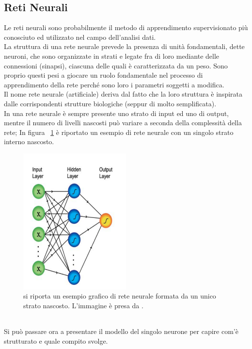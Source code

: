 \newpage

\subsection{Reti Neurali}
\label{reti neurali}
Le reti neurali sono probabilmente il metodo di apprendimento supervisionato più conosciuto ed utilizzato nel campo dell'analisi dati. \\
La struttura di una rete neurale prevede la presenza di unità fondamentali, dette neuroni, che sono organizzate in strati e legate fra di loro mediante delle connessioni (sinapsi), ciascuna delle quali è caratterizzata da un peso. Sono proprio questi pesi a giocare un ruolo fondamentale nel processo di apprendimento della rete perché sono loro i parametri soggetti a modifica.\\
Il nome rete neurale (artificiale) deriva dal fatto che la loro struttura è inspirata dalle corrispondenti strutture biologiche (seppur di molto semplificata). \\
In una rete neurale è sempre presente uno strato di input ed uno di output, mentre il numero di livelli nascosti può variare a seconda della complessità della rete; In figura ~\ref{fig:schemaNN} è riportato un esempio di rete neurale con un singolo strato interno nascosto.
\begin{figure}[h!]
	\centering
	\includegraphics[width=0.50\textwidth]{figs/schemaNN.png}
	\caption{si riporta un esempio grafico di rete neurale formata da un unico strato nascosto. L'immagine è presa da \cite{Metodi_multivariati}.}
	\label{fig:schemaNN}
\end{figure}
\\
Si può passare ora a presentare il modello del singolo neurone per capire com'è strutturato e quale compito svolge.
